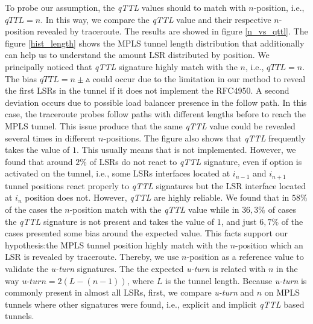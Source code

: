 To probe our assumption, the \textit{qTTL} values should to match with
$n$-position, i.e., $\textit{qTTL}=n$. In this way, we compare the \textit{qTTL} value and their respective $n$-position revealed by traceroute. The
results are showed in figure \ref{n_vs_qttl}. The figure \ref{hist_length} shows the MPLS tunnel length distribution that additionally can help us to understand the amount LSR distributed by position. We principally noticed that \textit{qTTL}
signature highly match with the $n$, i.e., $\textit{qTTL}=n$.  The bias $\textit{qTTL}=n \pm \vartriangle$ could
occur due to the limitation in our method to reveal the first LSRs in
the tunnel if it does not implement the RFC4950. %
A second deviation
occurs due to possible load balancer presence in the follow path. In this case,
the traceroute probes follow paths with different lengths before to reach the
MPLS tunnel. This issue
produce that the same \textit{qTTL} value could be revealed several times in different
$n$-positions. The figure also shows that \textit{qTTL} 
frequently takes the value of $1$. This usually  means that \tpropagate is not implemented. However, we found that around $2\%$ of LSRs do not react to \textit{qTTL} signature, even if \tpropagate option is activated on the tunnel, i.e., some LSRs interfaces located at $i_{n-1}$  and $i_{n+1}$ tunnel positions react properly to \textit{qTTL} signatures but the LSR interface located at $i_n$ position does not.
However, \textit{qTTL} are highly reliable. We found that in $58\%$ of the cases the $n$-position match with the
\textit{qTTL} value while in $36,3\%$ of cases the \textit{qTTL} signature is not
present and takes the value of $1$, and just $6,7\%$ of the cases presented
some bias around the expected value. This facts support our hypothesis:the  MPLS tunnel position highly match with the $n$-position  which an LSR is revealed by traceroute. Thereby,  we use
$n$-position as a reference value to validate the \textit{u-turn} signatures. The the expected \textit{u-turn} is related with $n$ in the way $\textit{u-turn}=2(L-(n-1))$, where $L$ is the tunnel length. Because
\textit{u-turn} is commonly present in almost all LSRs, first, we compare \textit{u-turn} and $n$ on
MPLS tunnels  where other signatures were found, i.e., explicit and implicit \textit{qTTL} based tunnels.
